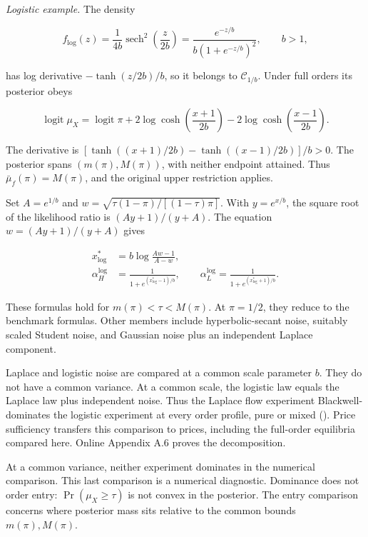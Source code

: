 \emph{Logistic example.}
The density

\[
f_{\mathrm{log}}(z)=\frac{1}{4b}\operatorname{sech}^{2}\left(\frac z{2b}\right)
=\frac{e^{-z/b}}{b(1+e^{-z/b})^2},\qquad b>1,
\tag{A.21}\label{eq:paper-a-21}
\]

has log derivative \(-\tanh(z/2b)/b\), so it belongs to \(\mathcal C_{1/b}\).
Under full orders its posterior obeys

\[
\operatorname{logit}\mu_X
=\operatorname{logit}\pi
+2\log\cosh\left(\frac{x+1}{2b}\right)
-2\log\cosh\left(\frac{x-1}{2b}\right).
\tag{A.22}\label{eq:paper-a-22}
\]

The derivative is
\([\tanh((x+1)/2b)-\tanh((x-1)/2b)]/b>0\).
The posterior spans \((m(\pi),M(\pi))\), with neither endpoint attained.
Thus \(\bar\mu_f(\pi)=M(\pi)\), and the original upper restriction applies.
\par
Set \(A=e^{1/b}\) and
\(w=\sqrt{\tau(1-\pi)/[(1-\tau)\pi]}\).
With \(y=e^{x/b}\), the square root of the likelihood ratio is
\((Ay+1)/(y+A)\).
The equation \(w=(Ay+1)/(y+A)\) gives

\[
\begin{aligned}
x^*_{\mathrm{log}}&=b\log\frac{Aw-1}{A-w},\\
\alpha_H^{\mathrm{log}}&=\frac1{1+e^{(x^*_{\mathrm{log}}-1)/b}},\qquad
\alpha_L^{\mathrm{log}}=\frac1{1+e^{(x^*_{\mathrm{log}}+1)/b}}.
\end{aligned}
\tag{A.23}\label{eq:paper-a-23}
\]

These formulas hold for \(m(\pi)<\tau<M(\pi)\).
At \(\pi=1/2\), they reduce to the benchmark formulas.
Other members include hyperbolic-secant noise, suitably scaled Student noise, and Gaussian noise plus an independent Laplace component.

Laplace and logistic noise are compared at a common scale parameter \(b\).
They do not have a common variance.
At a common scale, the logistic law equals the Laplace law plus independent noise.
Thus the Laplace flow experiment Blackwell-dominates the logistic experiment at every order profile, pure or mixed
().
Price sufficiency transfers this comparison to prices, including the full-order equilibria compared here.
Online Appendix A.6 proves the decomposition.
\par
At a common variance, neither experiment dominates in the numerical comparison.
This last comparison is a numerical diagnostic.
Dominance does not order entry: \(\Pr(\mu_X\ge\tau)\) is not convex in the posterior.
The entry comparison concerns where posterior mass sits relative to the common bounds \(m(\pi),M(\pi)\).
